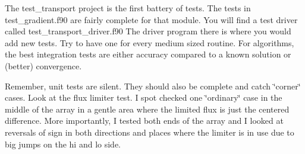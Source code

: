 The test\_\-transport project is the first battery of tests. The tests in test\_\-gradient.f90 are fairly complete for that module. You will find a test driver called test\_\-transport\_\-driver.f90 The driver program there is where you would add new tests. Try to have one for every medium sized routine. For algorithms, the best integration tests are either accuracy compared to a known solution or (better) convergence.

Remember, unit tests are silent. They should also be complete and catch \char`\"{}corner\char`\"{} cases. Look at the flux limiter test. I spot checked one \char`\"{}ordinary\char`\"{} case in the middle of the array in a gentle area where the limited flux is just the centered difference. More importantly, I tested both ends of the array and I looked at reversals of sign in both directions and places where the limiter is in use due to big jumps on the hi and lo side.

